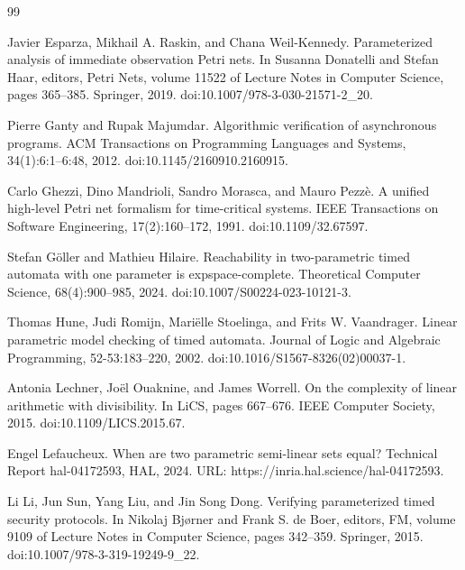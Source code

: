 \begin{thebibliography}{99}
\par\noindent    Javier Esparza, Mikhail A. Raskin, and Chana Weil-Kennedy.  Parameterized analysis of immediate observation Petri nets.  In Susanna Donatelli and Stefan Haar, editors, Petri Nets, volume 11522 of Lecture Notes in Computer Science, pages 365--385. Springer, 2019.  doi:10.1007/978-3-030-21571-2\_20.  

\par\noindent    Pierre Ganty and Rupak Majumdar.  Algorithmic verification of asynchronous programs.  ACM Transactions on Programming Languages and Systems, 34(1):6:1--6:48, 2012.  doi:10.1145/2160910.2160915.  

\par\noindent    Carlo Ghezzi, Dino Mandrioli, Sandro Morasca, and Mauro Pezzè.  A unified high-level Petri net formalism for time-critical systems.  IEEE Transactions on Software Engineering, 17(2):160--172, 1991.  doi:10.1109/32.67597.  

\par\noindent    Stefan Göller and Mathieu Hilaire.  Reachability in two-parametric timed automata with one parameter is expspace-complete.  Theoretical Computer Science, 68(4):900--985, 2024.  doi:10.1007/S00224-023-10121-3.  

\par\noindent    Thomas Hune, Judi Romijn, Mariëlle Stoelinga, and Frits W. Vaandrager.  Linear parametric model checking of timed automata.  Journal of Logic and Algebraic Programming, 52-53:183--220, 2002.  doi:10.1016/S1567-8326(02)00037-1.  

\par\noindent    Antonia Lechner, Joël Ouaknine, and James Worrell.  On the complexity of linear arithmetic with divisibility.  In LiCS, pages 667--676. IEEE Computer Society, 2015.  doi:10.1109/LICS.2015.67.  

\par\noindent    Engel Lefaucheux.  When are two parametric semi-linear sets equal?  Technical Report hal-04172593, HAL, 2024.  URL: https://inria.hal.science/hal-04172593.  

\par\noindent    Li Li, Jun Sun, Yang Liu, and Jin Song Dong.  Verifying parameterized timed security protocols.  In Nikolaj Bjørner and Frank S. de Boer, editors, FM, volume 9109 of Lecture Notes in Computer Science, pages 342--359. Springer, 2015.  doi:10.1007/978-3-319-19249-9\_22.  


\end{thebibliography}
